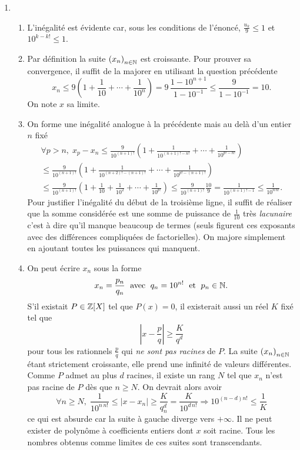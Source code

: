 \begin{enumerate}
  \item
\begin{enumerate}
  \item L'inégalité est évidente car, sous les conditions de l'énoncé, $\frac{u_k}{9}\leq 1$ et $10 ^{k - k!}\leq 1$. 
  \item Par définition la suite $\left( x_n\right)_{n\in \mathbb{N}}$ est croissante. Pour prouver sa convergence, il suffit de la majorer en utilisant la question précédente
\begin{displaymath}
x_n \leq 9\left( 1 + \frac{1}{10} + \cdots + \frac{1}{10^{n}}\right) =9\,\frac{1-10^{n+1}}{1-10^{-1}}\leq \frac{9}{1-10^{-1}}= 10 . 
\end{displaymath}
On note $x$ sa limite.
  \item On forme une inégalité analogue à la précédente mais au delà d'un entier $n$ fixé
\begin{multline*}
\forall p>n,\;
x_p - x_n \leq \frac{9}{10^{(n+1)!}} \left( 1 + \frac{1}{10^{(n+1)!-n!}} + \cdots + \frac{1}{10^{p!-n!}}\right)\\
\leq \frac{9}{10^{(n+1)!}} \left( 1 + \frac{1}{10^{(n+2)!-(n+1)!}} + \cdots + \frac{1}{10^{p!-(n+1)!}}\right)\\
\leq \frac{9}{10^{(n+1)!}} \left( 1 + \frac{1}{10} + \frac{1}{10^2} + \cdots + \frac{1}{10^{p!}}\right)
\leq \frac{9}{10^{(n+1)!}}\frac{10}{9}=\frac{1}{10^{(n+1)!-1}}\leq \frac{1}{10^{n\,n!}}.
\end{multline*}
Pour justifier l'inégalité du début de la troisième ligne, il suffit de réaliser que la somme considérée est une somme de puissance de $\frac{1}{10}$ très \emph{lacunaire} c'est à dire qu'il manque beaucoup de termes (seuls figurent ces exposants avec des différences compliquées de factorielles). On majore simplement en ajoutant toutes les puissances qui manquent.
  \item On peut écrire $x_n$ sous la forme
\begin{displaymath}
  x_n = \frac{p_n}{q_n} \; \text{ avec }\; q_n = 10^{n!} \;\text{ et }\; p_n\in \mathbb{N}.
\end{displaymath}
S'il existait $P\in \mathbb{Z}[X]$ tel que $P(x)=0$, il existerait aussi un réel $K$ fixé tel que 
\begin{displaymath}
  \left|x-\frac{p}{q}\right| \geq \frac{K}{q^d}
\end{displaymath}
pour tous les rationnels $\frac{p}{q}$ qui \emph{ne sont pas racines} de $P$.
La suite $\left( x_n\right)_{n\in \mathbb{N}}$ étant strictement croissante, elle prend une infinité de valeurs différentes. Comme $P$ admet au plus $d$ racines, il existe un rang $N$ tel que $x_n$ n'est pas racine de $P$ dès que $n\geq N$. On devrait alors avoir
\begin{displaymath}
\forall n\geq N,\;  \frac{1}{10^{n\,n!}}\leq \left|x-x_n\right|\geq \frac{K}{q_n^d}= \frac{K}{10^{d\,n!}}
\Rightarrow 10^{(n-d)n!} \leq \frac{1}{K}
\end{displaymath}
ce qui est absurde car la suite à gauche diverge vers $+\infty$.\newline
Il ne peut exister de polynôme à coefficients entiers dont $x$ soit racine. Tous les nombres obtenus comme limites de ces suites sont transcendants.


\end{enumerate}
\end{enumerate}
